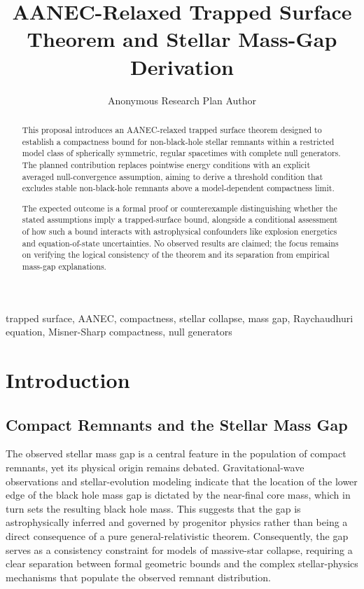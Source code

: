 \documentclass[conference]{IEEEtran}
\begin{document}
\title{AANEC-Relaxed Trapped Surface Theorem and Stellar Mass-Gap Derivation}\author{Anonymous Research Plan Author}\maketitle

\begin{abstract}
This proposal introduces an AANEC-relaxed trapped surface theorem designed to establish a compactness bound for non-black-hole stellar remnants within a restricted model class of spherically symmetric, regular spacetimes with complete null generators. The planned contribution replaces pointwise energy conditions with an explicit averaged null-convergence assumption, aiming to derive a threshold condition that excludes stable non-black-hole remnants above a model-dependent compactness limit.

The expected outcome is a formal proof or counterexample distinguishing whether the stated assumptions imply a trapped-surface bound, alongside a conditional assessment of how such a bound interacts with astrophysical confounders like explosion energetics and equation-of-state uncertainties. No observed results are claimed; the focus remains on verifying the logical consistency of the theorem and its separation from empirical mass-gap explanations.
\end{abstract}
\begin{IEEEkeywords}
trapped surface, AANEC, compactness, stellar collapse, mass gap, Raychaudhuri equation, Misner-Sharp compactness, null generators
\end{IEEEkeywords}\section{Introduction}
\subsection{Compact Remnants and the Stellar Mass Gap}
The observed stellar mass gap is a central feature in the population of compact remnants, yet its physical origin remains debated. Gravitational-wave observations and stellar-evolution modeling indicate that the location of the lower edge of the black hole mass gap is dictated by the near-final core mass, which in turn sets the resulting black hole mass. This suggests that the gap is astrophysically inferred and governed by progenitor physics rather than being a direct consequence of a pure general-relativistic theorem. Consequently, the gap serves as a consistency constraint for models of massive-star collapse, requiring a clear separation between formal geometric bounds and the complex stellar-physics mechanisms that populate the observed remnant distribution.~\cite{cite_fd0f77b2a173c0ab,cite_7a407c865faafd11}
\end{document}
